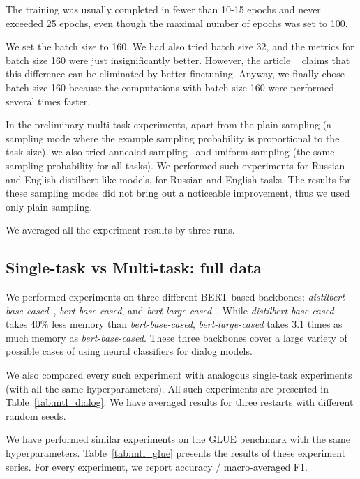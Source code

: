 \begin{itemize}
The training was usually completed in fewer than 10-15 epochs and never exceeded 25 epochs, even though the maximal number of epochs was set to 100.

We set the batch size to 160. We had also tried batch size 32, and the metrics for batch size 160 were just insignificantly better. However, the article ~\cite{tuning_neural_networks} claims that this difference can be eliminated by better finetuning. Anyway, we finally chose batch size 160 because the computations with batch size 160 were performed several times faster.

In the preliminary multi-task experiments, apart from the plain sampling (a sampling mode where the example sampling probability is proportional to the task size), we also tried annealed sampling~\cite{PAL:19} and uniform sampling (the same sampling probability for all tasks). We performed such experiments for Russian and English distilbert-like models, for Russian and English tasks. The results for these sampling modes did not bring out a noticeable improvement, thus we used only plain sampling.

We averaged all the experiment results by three runs. %


\subsection{Single-task vs Multi-task: full data}

We performed experiments on three different BERT-based backbones: \textit{distilbert-base-cased}~\cite{alina}, \textit{bert-base-cased}, and \textit{bert-large-cased}~\cite{bert}. While \textit{distilbert-base-cased} takes 40\% less memory than \textit{bert-base-cased}, \textit{bert-large-cased} takes 3.1 times as much memory as \textit{bert-base-cased}. These three backbones cover a large variety of possible cases of using neural classifiers for dialog models. %

We also compared every such experiment with analogous single-task experiments (with all the same hyperparameters). All such experiments are presented in Table~\ref{tab:mtl_dialog}. We have averaged results for three restarts with different random seeds.

We have performed similar experiments on the GLUE benchmark with the same hyperparameters.
Table~\ref{tab:mtl_glue} presents the results of these experiment series. For every experiment, we report accuracy / macro-averaged F1.


\end{itemize}
